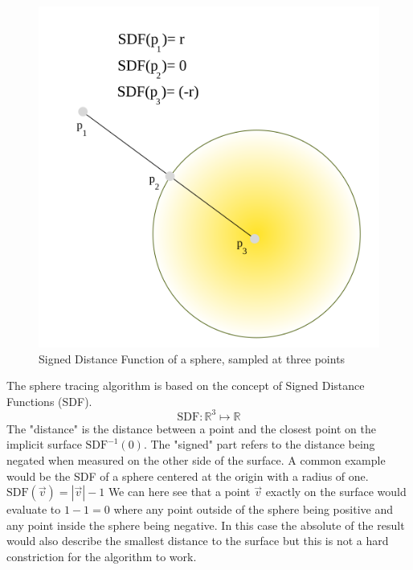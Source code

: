 		\begin{figure}
			\begin{flushright}
				\includegraphics[width=0.9\linewidth]{figure/SDF} 
			\end{flushright}
			\caption{ Signed Distance Function of a sphere, sampled at three points}
			\vspace{40pt}
		\end{figure}
		
		The sphere tracing algorithm is based on the concept of Signed Distance
		Functions (SDF).  $$\text{SDF}:\mathbb{R}^{3}\mapsto\mathbb{R}$$ The
		"distance" is the distance between a point and the closest point on the
		implicit surface $\text{SDF}^{-1}(0)$. 
		The "signed" part refers to the distance being negated when measured on the
		other side of the surface. A common example would be the SDF of a sphere
		centered at the origin with a radius of one. $\text{SDF}(\vec{v}) =
		|\vec{v}| - 1$ We can here see that a point $\vec{v}$ exactly on the
		surface would evaluate to $1 - 1 = 0$  where any point outside of the
		sphere being positive and any point inside the sphere being negative. In
		this case the absolute of the result would also describe the smallest
		distance to the surface but this is not a hard constriction for the
		algorithm to work.
		
